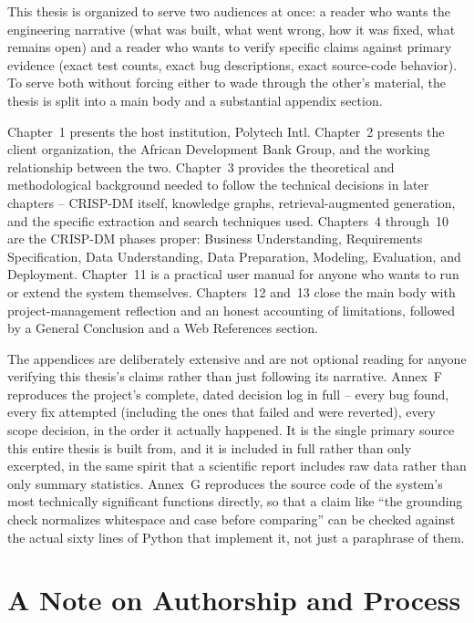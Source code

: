 This thesis is organized to serve two audiences at once: a reader who wants the engineering narrative (what was built, what went wrong, how it was fixed, what remains open) and a reader who wants to verify specific claims against primary evidence (exact test counts, exact bug descriptions, exact source-code behavior). To serve both without forcing either to wade through the other's material, the thesis is split into a main body and a substantial appendix section.

Chapter~1 presents the host institution, Polytech Intl. Chapter~2 presents the client organization, the African Development Bank Group, and the working relationship between the two. Chapter~3 provides the theoretical and methodological background needed to follow the technical decisions in later chapters -- CRISP-DM itself, knowledge graphs, retrieval-augmented generation, and the specific extraction and search techniques used. Chapters~4 through~10 are the CRISP-DM phases proper: Business Understanding, Requirements Specification, Data Understanding, Data Preparation, Modeling, Evaluation, and Deployment. Chapter~11 is a practical user manual for anyone who wants to run or extend the system themselves. Chapters~12 and~13 close the main body with project-management reflection and an honest accounting of limitations, followed by a General Conclusion and a Web References section.

The appendices are deliberately extensive and are not optional reading for anyone verifying this thesis's claims rather than just following its narrative. Annex~F reproduces the project's complete, dated decision log in full -- every bug found, every fix attempted (including the ones that failed and were reverted), every scope decision, in the order it actually happened. It is the single primary source this entire thesis is built from, and it is included in full rather than only excerpted, in the same spirit that a scientific report includes raw data rather than only summary statistics. Annex~G reproduces the source code of the system's most technically significant functions directly, so that a claim like ``the grounding check normalizes whitespace and case before comparing'' can be checked against the actual sixty lines of Python that implement it, not just a paraphrase of them.

\section*{A Note on Authorship and Process}

